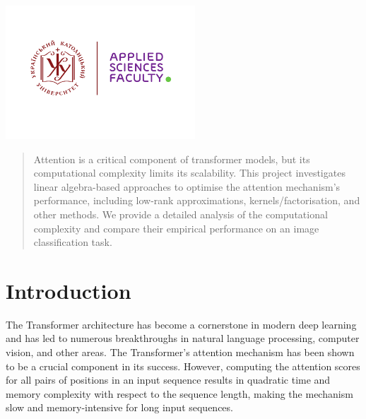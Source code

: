 \begin{titlepage}

\includegraphics[height=5cm]{UCU-Apps.png}\\[1cm] %
 

\vfill %

\end{titlepage}

\begin{abstract}
Attention is a critical component of transformer models, but its computational complexity limits its scalability. This project investigates linear algebra-based approaches to optimise the attention mechanism's performance, including low-rank approximations, kernels/factorisation, and other methods. We provide a detailed analysis of the computational complexity and compare their empirical performance on an image classification task.
\end{abstract}

\section{Introduction}
The Transformer architecture has become a cornerstone in modern deep learning and has led to numerous breakthroughs in natural language processing, computer vision, and other areas. The Transformer's attention mechanism has been shown to be a crucial component in its success. However, computing the attention scores for all pairs of positions in an input sequence results in quadratic time and memory complexity with respect to the sequence length, making the mechanism slow and memory-intensive for long input sequences.

